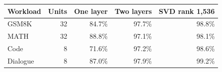 \begin{tabular}{lrrrr}
\toprule
Workload & Units & One layer & Two layers & SVD rank 1,536 \\
\midrule
GSM8K & 32 & 84.7\% & 97.7\% & 98.8\% \\
MATH & 32 & 88.8\% & 97.1\% & 98.1\% \\
Code & 8 & 71.6\% & 97.2\% & 98.6\% \\
Dialogue & 8 & 87.0\% & 97.9\% & 99.2\% \\
\bottomrule
\end{tabular}
